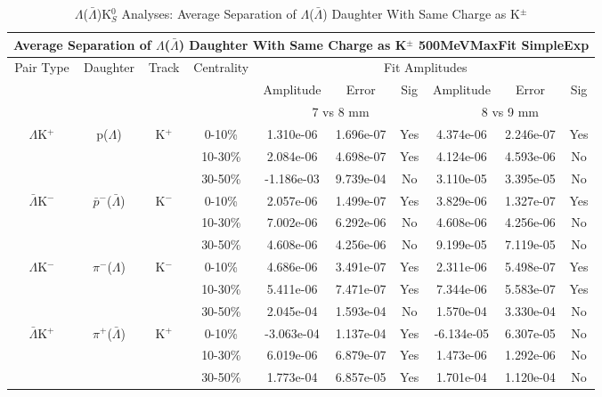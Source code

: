\documentclass[../AnalysisNoteJBuxton.tex]{subfiles}
\begin{document}
\begin{table}
 \centering
 \begin{tabular}{|c|c|c|c|c|c|c||c|c|c|}
  \multicolumn{10}{c}{Average Separation of $\Lambda$($\bar{\Lambda}$) Daughter With Same Charge as K$^{\pm}$ 500MeVMaxFit SimpleExp} \\
  \hline
  \multirow{3}{*}{Pair Type} & \multirow{3}{*}{Daughter} & \multirow{3}{*}{Track} & \multirow{3}{*}{Centrality} & \multicolumn{6}{c|}{Fit Amplitudes} \\
  \cline{5-10}
   & & & & Amplitude & Error & Sig & Amplitude & Error & Sig \\  
  \cline{5-10}
   & & & & \multicolumn{3}{c||}{7 vs 8 mm} & \multicolumn{3}{c|}{8 vs 9 mm} \\  
  \hline
  \multirow{3}{*}{$\Lambda$K$^{+}$} & \multirow{3}{*}{p($\Lambda$)} & \multirow{3}{*}{K$^{+}$}
   &      0-10\% & 1.310e-06 & 1.696e-07 & Yes & 4.374e-06 & 2.246e-07 & Yes \\
   & & & 10-30\% & 2.084e-06 & 4.698e-07 & Yes & 4.124e-06 & 4.593e-06 & No \\
   & & & 30-50\% & -1.186e-03 & 9.739e-04 & No & 3.110e-05 & 3.395e-05 & No \\
  \hline
  \multirow{3}{*}{$\bar{\Lambda}$K$^{-}$} & \multirow{3}{*}{$\bar{p}^{-}$($\bar{\Lambda}$)} & \multirow{3}{*}{K$^{-}$}
   &      0-10\% & 2.057e-06 & 1.499e-07 & Yes & 3.829e-06 & 1.327e-07 & Yes \\
   & & & 10-30\% & 7.002e-06 & 6.292e-06 & No & 4.608e-06 & 4.256e-06 & No \\
   & & & 30-50\% & 4.608e-06 & 4.256e-06 & No & 9.199e-05 & 7.119e-05 & No \\
  \hline \hline
  \multirow{3}{*}{$\Lambda$K$^{-}$} & \multirow{3}{*}{$\pi^{-}$($\Lambda$)} & \multirow{3}{*}{K$^{-}$}
   &      0-10\% & 4.686e-06 & 3.491e-07 & Yes & 2.311e-06 & 5.498e-07 & Yes \\
   & & & 10-30\% & 5.411e-06 & 7.471e-07 & Yes & 7.344e-06 & 5.583e-07 & Yes \\
   & & & 30-50\% & 2.045e-04 & 1.593e-04 & No & 1.570e-04 & 3.330e-04 & No \\
  \hline
  \multirow{3}{*}{$\bar{\Lambda}$K$^{+}$} & \multirow{3}{*}{$\pi^{+}$($\bar{\Lambda}$)} & \multirow{3}{*}{K$^{+}$}
   &      0-10\% & -3.063e-04 & 1.137e-04 & Yes & -6.134e-05 & 6.307e-05 & No \\
   & & & 10-30\% & 6.019e-06 & 6.879e-07 & Yes & 1.473e-06 & 1.292e-06 & No \\
   & & & 30-50\% & 1.773e-04 & 6.857e-05 & Yes & 1.701e-04 & 1.120e-04 & No \\
  \hline
 \end{tabular}
 \caption{$\Lambda$($\bar{\Lambda}$)K$^{0}_{S}$ Analyses: Average Separation of $\Lambda$($\bar{\Lambda}$) Daughter With Same Charge as K$^{\pm}$}
 \label{tab:AvgSepLamKch_500MeVMaxFit_SimpleExp}
\end{table}

\end{document}
